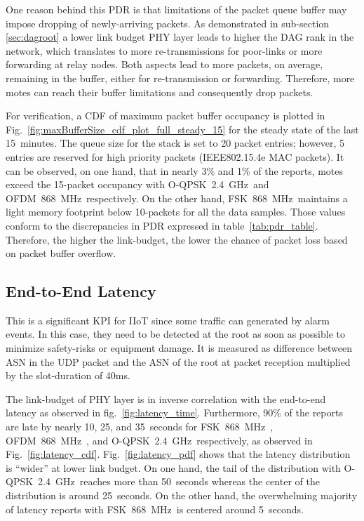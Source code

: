 \documentclass[journal]{IEEEtran}
\newcommand{\fsk}          {FSK~868~MHz}
\newcommand{\oqpsk}        {O-QPSK~2.4~GHz}
\newcommand{\ofdm}         {OFDM~868~MHz}
\begin{document}

One reason behind this PDR is that limitations of the packet queue buffer may impose dropping of newly-arriving packets.
As demonstrated in sub-section \ref{sec:dagroot} a lower link budget PHY layer leads to higher the DAG rank in the network, which translates to more re-transmissions for poor-links or more forwarding at relay nodes. 
Both aspects lead to more packets, on average, remaining in the buffer, either for re-transmission or forwarding.
Therefore, more motes can reach their buffer limitations and consequently drop packets.


For verification, a CDF of maximum packet buffer occupancy is plotted in Fig.~\ref{fig:maxBufferSize_cdf_plot_full_steady_15} for the steady state of the last 15~minutes. 
The queue size for the stack is set to 20 packet entries; however, 5 entries are reserved for high priority packets (IEEE802.15.4e MAC packets).
It can be observed, on one hand, that in nearly 3\% and 1\% of the reports, motes exceed the 15-packet occupancy with \oqpsk\ and \ofdm\ respectively.
On the other hand, \fsk\ maintains a light memory footprint below 10-packets for all the data samples. 
Those values conform to the discrepancies in PDR expressed in table~\ref{tab:pdr_table}. 
Therefore, the higher the link-budget, the lower the chance of packet loss based on packet buffer overflow. 

\subsection{End-to-End Latency}
\label{sec:latency}


This is a significant KPI for IIoT since some traffic can generated by alarm events.
In this case, they need to be detected at the root as soon as possible to minimize safety-risks or equipment damage.
It is measured as difference between ASN in the UDP packet and the ASN of the root at packet reception multiplied by the slot-duration of 40ms.


The link-budget of PHY layer is in inverse correlation with the end-to-end latency as observed in fig.~\ref{fig:latency_time}.
Furthermore, 90\% of the reports are late by nearly 10, 25, and 35~seconds for \fsk\ , \ofdm\ , and \oqpsk\ respectively, as observed in Fig.~\ref{fig:latency_cdf}.
Fig.~\ref{fig:latency_pdf} shows that the latency distribution is ``wider'' at lower link budget.
On one hand, the tail of the distribution with \oqpsk\  reaches more than 50~seconds whereas the center of the distribution is around 25~seconds.
On the other hand, the overwhelming majority of latency reports with \fsk\ is centered around 5~seconds.
\end{document}
